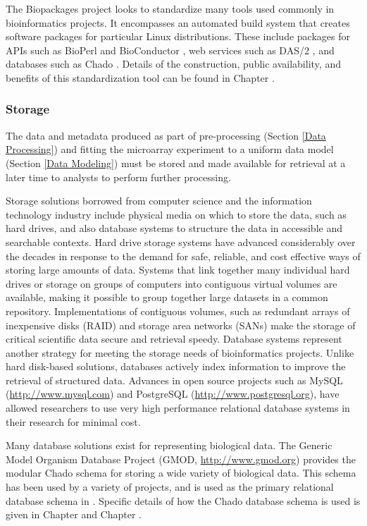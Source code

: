 The Biopackages project looks to standardize many tools used commonly in
bioinformatics projects. It encompasses an automated build system that creates
software packages for particular Linux distributions.  These include packages
for APIs such as BioPerl \cite{bioperl} and BioConductor \cite{bioc}, web
services such as DAS/2 \cite{das}, and databases such as Chado \cite{chado}.
Details of the construction, public availability, and benefits of this
standardization tool can be found in Chapter \biopackageschapter.

\subsubsection{Storage}\label{Storage}

The data and metadata produced as part of pre-processing (Section \ref{Data
Processing}) and fitting the microarray experiment to a uniform data model
(Section \ref{Data Modeling}) must be stored and made available for retrieval
at a later time to analysts to perform further processing.

Storage solutions borrowed from computer science and the information technology
industry include physical media on which to store the data, such as hard
drives, and also database systems to structure the data in accessible and
searchable contexts.  Hard drive storage systems have advanced considerably
over the decades in response to the demand for safe, reliable, and cost
effective ways of storing large amounts of data.  Systems that link together
many individual hard drives or storage on groups of computers into contiguous
virtual volumes are available, making it possible to group together large
datasets in a common repository.  Implementations of contiguous volumes, such
as redundant arrays of inexpensive disks (RAID) and storage area networks
(SANs) make the storage of critical scientific data secure and retrieval
speedy.  Database systems represent another strategy for meeting the storage
needs of bioinformatics projects.  Unlike hard disk-based solutions, databases
actively index information to improve the retrieval of structured data.
Advances in open source projects such as MySQL (\url{http://www.mysql.com}) and
PostgreSQL (\url{http://www.postgresql.org}), have allowed researchers to use
very high performance relational database systems in their research for minimal
cost.

Many database solutions exist for representing biological data.  The Generic
Model Organism Database Project (GMOD, \url{http://www.gmod.org}) provides the
modular Chado schema \cite{chado} for storing a wide variety of biological
data.  This schema has been used by a variety of projects, and is used as the
primary relational database schema in \dbthesis.  Specific details of how the
Chado database schema is used is given in Chapter \celsiuschapter and Chapter
\gmodwebchapter.
